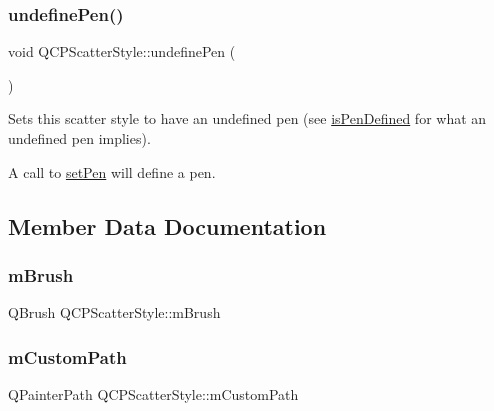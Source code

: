 \subsubsection{\texorpdfstring{undefinePen()}{undefinePen()}}
{\footnotesize\ttfamily void Q\+C\+P\+Scatter\+Style\+::undefine\+Pen (\begin{DoxyParamCaption}{ }\end{DoxyParamCaption})}

Sets this scatter style to have an undefined pen (see \mbox{\hyperlink{class_q_c_p_scatter_style_a47077eb6450fe9a788f833e4ec1b1d5a}{is\+Pen\+Defined}} for what an undefined pen implies).

A call to \mbox{\hyperlink{class_q_c_p_scatter_style_a761f1f229cc0ca4703e1e2b89f6dd1ba}{set\+Pen}} will define a pen. 

\subsection{Member Data Documentation}
\mbox{\label{class_q_c_p_scatter_style_a1b9c6ab10aebcaf236f1f45d1d6d64d1}} 
\subsubsection{\texorpdfstring{mBrush}{mBrush}}
{\footnotesize\ttfamily Q\+Brush Q\+C\+P\+Scatter\+Style\+::m\+Brush\hspace{0.3cm}{\ttfamily [protected]}}

\mbox{\label{class_q_c_p_scatter_style_a813cb074744dc5a2f59cc99d6a10c6f0}} 
\subsubsection{\texorpdfstring{mCustomPath}{mCustomPath}}
{\footnotesize\ttfamily Q\+Painter\+Path Q\+C\+P\+Scatter\+Style\+::m\+Custom\+Path\hspace{0.3cm}{\ttfamily [protected]}}

\mbox{\label{class_q_c_p_scatter_style_a0f6a85e6d1e3ae1ca1b6efb4d4cdfe17}} 
